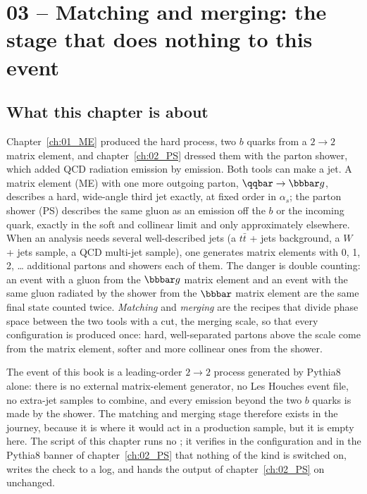 \chapter{03 -- Matching and merging: the stage that does nothing to this event}
\label{ch:03_MnM}

\section{What this chapter is about}

Chapter~\ref{ch:01_ME} produced the hard process, two $b$ quarks from a $2\to2$ matrix element, and
chapter~\ref{ch:02_PS} dressed them with the parton shower, which added QCD radiation emission by emission. Both
tools can make a jet. A matrix element (ME) with one more outgoing parton, $\qqbar\to\bbbar g$, describes a hard,
wide-angle third jet exactly, at fixed order in $\alpha_s$; the parton shower (PS) describes the same gluon as an
emission off the $b$ or the incoming quark, exactly in the soft and collinear limit and only approximately elsewhere.
When an analysis needs several well-described jets (a $t\bar{t}$ + jets background, a $W$ + jets sample, a QCD
multi-jet sample), one generates matrix elements with 0, 1, 2, \dots{} additional partons and showers each of them.
The danger is double counting: an event with a gluon from the $\bbbar g$ matrix element and an event with the same
gluon radiated by the shower from the $\bbbar$ matrix element are the same final state counted twice. \emph{Matching}
and \emph{merging} are the recipes that divide phase space between the two tools with a cut, the merging scale, so
that every configuration is produced once: hard, well-separated partons above the scale come from the matrix element,
softer and more collinear ones from the shower.

The event of this book is a leading-order $2\to2$ process generated by Pythia8 alone: there is no external
matrix-element generator, no Les Houches event file, no extra-jet samples to combine, and every emission beyond the
two $b$ quarks is made by the shower. The matching and merging stage therefore exists in the journey, because it is
where it would act in a production sample, but it is empty here. The script of this chapter runs no ; it
verifies in the configuration and in the Pythia8 banner of chapter~\ref{ch:02_PS} that nothing of the kind is switched
on, writes the check to a log, and hands the output of chapter~\ref{ch:02_PS} on unchanged.

